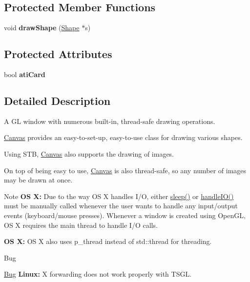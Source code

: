 \subsection*{Protected Member Functions}
\begin{DoxyCompactItemize}
\item 
\hypertarget{classtsgl_1_1_canvas_a560e3f64f3b2e5a7af8a8d7b92d8e660}{}void {\bfseries draw\+Shape} (\hyperlink{classtsgl_1_1_shape}{Shape} $\ast$s)\label{classtsgl_1_1_canvas_a560e3f64f3b2e5a7af8a8d7b92d8e660}

\end{DoxyCompactItemize}
\subsection*{Protected Attributes}
\begin{DoxyCompactItemize}
\item 
\hypertarget{classtsgl_1_1_canvas_a1558f2f09228ccaf0d46cec233a2dac7}{}bool {\bfseries ati\+Card}\label{classtsgl_1_1_canvas_a1558f2f09228ccaf0d46cec233a2dac7}

\end{DoxyCompactItemize}


\subsection{Detailed Description}
A G\+L window with numerous built-\/in, thread-\/safe drawing operations. 

\hyperlink{classtsgl_1_1_canvas}{Canvas} provides an easy-\/to-\/set-\/up, easy-\/to-\/use class for drawing various shapes.

Using S\+T\+B, \hyperlink{classtsgl_1_1_canvas}{Canvas} also supports the drawing of images.

On top of being easy to use, \hyperlink{classtsgl_1_1_canvas}{Canvas} is also thread-\/safe, so any number of images may be drawn at once. \begin{DoxyNote}{Note}
{\bfseries O\+S X\+:} Due to the way O\+S X handles I/\+O, either \hyperlink{classtsgl_1_1_canvas_a2604fa056d4541f918ccf447eda1f3cf}{sleep()} or \hyperlink{classtsgl_1_1_canvas_aa499851e5e4b97bb99ca4fb3d633c17e}{handle\+I\+O()} must be manually called whenever the user wants to handle any input/output events (keyboard/mouse presses). Whenever a window is created using Open\+G\+L, O\+S X requires the main thread to handle I/\+O calls. 

{\bfseries O\+S X\+:} O\+S X also uses p\+\_\+thread instead of std\+::thread for threading. 
\end{DoxyNote}
\begin{DoxyRefDesc}{Bug}
\item[\hyperlink{bug__bug000001}{Bug}]{\bfseries Linux\+:} X forwarding does not work properly with T\+S\+G\+L. \end{DoxyRefDesc}


